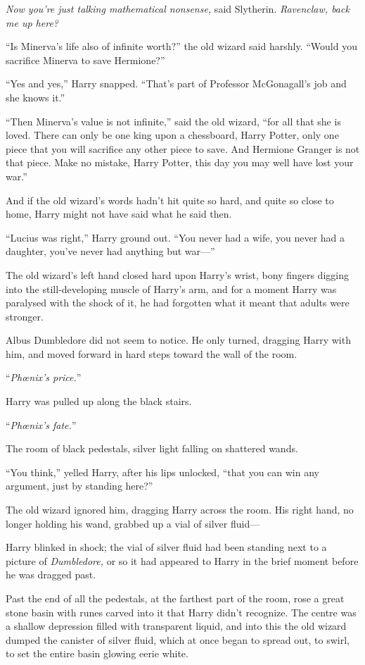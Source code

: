 \emph{Now you’re just talking mathematical nonsense,} said Slytherin. \emph{Ravenclaw, back me up here?}

“Is Minerva’s life also of infinite worth?” the old wizard said harshly.
“Would you sacrifice Minerva to save Hermione?”

“Yes and yes,” Harry snapped.
“That’s part of Professor McGonagall’s job and she knows it.”

“Then Minerva’s value is not infinite,” said the old wizard, “for all that she is loved. There can only be one king upon a chessboard, Harry Potter, only one piece that you will sacrifice any other piece to save. And Hermione Granger is not that piece. Make no mistake, Harry Potter, this day you may well have lost your war.”

And if the old wizard’s words hadn’t hit quite so hard, and quite so close to home, Harry might not have said what he said then.

“Lucius was right,” Harry ground out.
“You never had a wife, you never had a daughter, you’ve never had anything but war—”

The old wizard’s left hand closed hard upon Harry’s wrist, bony fingers digging into the still-developing muscle of Harry’s arm, and for a moment Harry was paralysed with the shock of it, he had forgotten what it meant that adults were stronger.

Albus Dumbledore did not seem to notice. He only turned, dragging Harry with him, and moved forward in hard steps toward the wall of the room.

“\emph{Phœnix’s price.}”

Harry was pulled up along the black stairs.

“\emph{Phœnix’s fate.}”

The room of black pedestals, silver light falling on shattered wands.

“You think,” yelled Harry, after his lips unlocked, “that you can win any argument, just by standing here?”

The old wizard ignored him, dragging Harry across the room. His right hand, no longer holding his wand, grabbed up a vial of silver fluid—

Harry blinked in shock; the vial of silver fluid had been standing next to a picture of \emph{Dumbledore,} or so it had appeared to Harry in the brief moment before he was dragged past.

Past the end of all the pedestals, at the farthest part of the room, rose a great stone basin with runes carved into it that Harry didn’t recognize. The centre was a shallow depression filled with transparent liquid, and into this the old wizard dumped the canister of silver fluid, which at once began to spread out, to swirl, to set the entire basin glowing eerie white.


